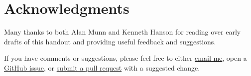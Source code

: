 
\section{Acknowledgments}
\label{sec:acknowledgments}

Many thanks to both Alan Munn and Kenneth Hanson for reading over early drafts of this handout and providing useful feedback and suggestions.

If you have comments or suggestions, please feel free to either \href{mailto:adam.liter@gmail.com}{email me}, open a \href{https://github.com/adamliter/latex-workshop/issues}{GitHub issue}, or \href{https://help.github.com/articles/creating-a-pull-request/}{submit a pull request} with a suggested change.
